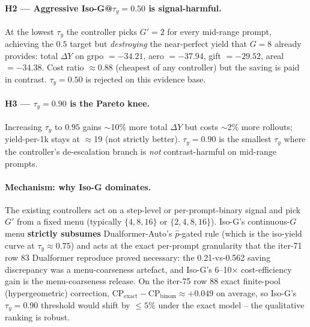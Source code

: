 \paragraph{H2 --- Aggressive Iso-G@$\tau_y{=}0.50$ is signal-harmful.}
At the lowest $\tau_y$ the controller picks $G'{=}2$ for every
mid-range prompt, achieving the $0.5$ target but \emph{destroying}
the near-perfect yield that $G{=}8$ already provides:
total $\Delta Y$ on grpo $=-34.21$, aero $=-37.94$, gift $=-29.52$,
areal $=-34.38$.  Cost ratio $\approx 0.88$ (cheapest of any
controller) but the saving is paid in contrast.  $\tau_y{=}0.50$
is rejected on this evidence base.

\paragraph{H3 --- $\tau_y{=}0.90$ is the Pareto knee.}
Increasing $\tau_y$ to $0.95$ gains $\sim$10\% more total
$\Delta Y$ but costs $\sim$2\% more rollouts; yield-per-1k stays
at $\approx$19 (not strictly better).  $\tau_y{=}0.90$ is the
smallest $\tau_y$ where the controller's de-escalation branch is
\emph{not} contrast-harmful on mid-range prompts.

\paragraph{Mechanism: why Iso-G dominates.}
The existing controllers act on a step-level or per-prompt-binary
signal and pick $G'$ from a fixed menu (typically $\{4, 8, 16\}$ or
$\{2, 4, 8, 16\}$).  Iso-G's continuous-$G$ menu \textbf{strictly
subsumes} Dualformer-Auto's $\hat p$-gated rule (which is the
iso-yield curve at $\tau_y \approx 0.75$) and acts at the exact
per-prompt granularity that the iter-71 row 83 Dualformer reproduce
proved necessary: the 0.21-vs-0.562 saving discrepancy was a
menu-coarseness artefact, and Iso-G's 6--10$\times$ cost-efficiency
gain is the menu-coarseness release.  On the iter-75 row 88 exact
finite-pool (hypergeometric) correction, $\mathrm{CP}_{\text{exact}}
- \mathrm{CP}_{\text{binom}} \approx +0.049$ on average, so Iso-G's
$\tau_y{=}0.90$ threshold would shift by $\le 5\%$ under the
exact model -- the qualitative ranking is robust.


